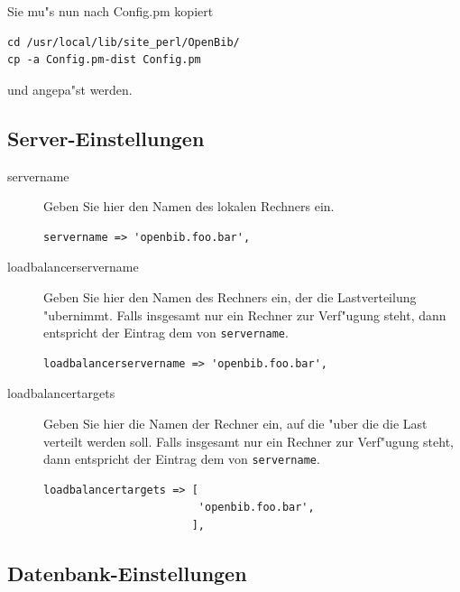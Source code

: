 \documentclass[11pt, twoside, a4paper, BCOR8mm, DIV12, bibtotoc,idxtotoc]{scrbook}
\begin{document}
Sie mu"s nun nach Config.pm kopiert 

\begin{verbatim}
cd /usr/local/lib/site_perl/OpenBib/
cp -a Config.pm-dist Config.pm
\end{verbatim}

und angepa"st werden.


\subsection{Server-Einstellungen}

\begin{description}
\item[servername] Geben Sie hier den Namen des lokalen Rechners
  ein. 
\begin{verbatim}
servername => 'openbib.foo.bar',
\end{verbatim}

\item[loadbalancerservername] Geben Sie hier den Namen des Rechners
  ein, der die Lastverteilung "ubernimmt. Falls insgesamt nur ein
  Rechner zur Verf"ugung steht, dann entspricht der Eintrag dem von
  \texttt{servername}.
\begin{verbatim}
loadbalancerservername => 'openbib.foo.bar',
\end{verbatim}

\item[loadbalancertargets] Geben Sie hier die Namen der Rechner ein,
  auf die "uber die die Last verteilt werden soll. Falls insgesamt nur
  ein Rechner zur Verf"ugung steht, dann entspricht der Eintrag dem
  von \texttt{servername}.
\begin{verbatim}
loadbalancertargets => [
                        'openbib.foo.bar',
                       ],
\end{verbatim}
\end{description}


\subsection{Datenbank-Einstellungen}
\end{document}
